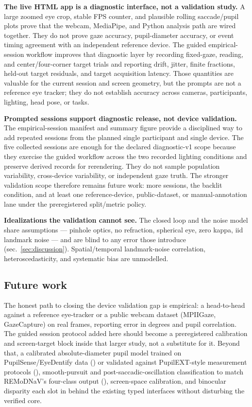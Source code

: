 \documentclass[
]{article}
\begin{document}
\textbf{The live HTML app is a diagnostic interface, not a validation
study.} A large zoomed eye crop, stable FPS counter, and plausible
rolling saccade/pupil plots prove that the webcam, MediaPipe, and Python
analysis path are wired together. They do not prove gaze accuracy,
pupil-diameter accuracy, or event timing agreement with an independent
reference device. The guided empirical-session workflow improves that
diagnostic layer by recording fixed-gaze, reading, and
center/four-corner target trials and reporting drift, jitter, finite
fractions, held-out target residuals, and target acquisition latency.
Those quantities are valuable for the current session and screen
geometry, but the prompts are not a reference eye tracker; they do not
establish accuracy across cameras, participants, lighting, head pose, or
tasks.

\textbf{Prompted sessions support diagnostic release, not device
validation.} The empirical-session manifest and summary figure provide a
disciplined way to add repeated sessions from the planned single
participant and single device. The five collected sessions are enough
for the declared diagnostic-v1 scope because they exercise the guided
workflow across the two recorded lighting conditions and preserve
derived records for rerendering. They do not sample population
variability, cross-device variability, or independent gaze truth. The
stronger validation scope therefore remains future work: more sessions,
the backlit condition, and at least one reference-device,
public-dataset, or manual-annotation lane under the preregistered
split/metric policy.

\textbf{Idealizations the validation cannot see.} The closed loop and
the noise model share assumptions --- pinhole optics, no refraction,
spherical eye, zero kappa, iid landmark noise --- and are blind to any
error those introduce (sec.~\ref{sec:discussion}). Spatial/temporal
landmark-noise correlation, heteroscedasticity, and systematic bias are
unmodelled.

\subsection{Future work}\label{future-work}

The honest path to closing the device validation gap is empirical: a
head-to-head against a reference eye-tracker or a public webcam dataset
(MPIIGaze, GazeCapture) on real frames, reporting error in degrees and
pupil correlation. The guided session protocol added here should become
a preregistered calibration and screen-target block inside that larger
study, not a substitute for it. Beyond that, a calibrated
absolute-diameter pupil model trained on PupilSense/EyeDentify data
() or validated
against PupilEXT-style measurement protocols
(), smooth-pursuit
and post-saccadic-oscillation classification to match REMoDNaV's
four-class output (), screen-space calibration, and binocular disparity each slot in
behind the existing typed interfaces without disturbing the verified
core.
\end{document}
